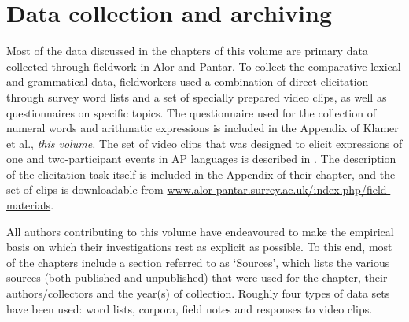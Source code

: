 {\section{Data collection and archiving}\label{sec:1:8}

Most of the data discussed in the chapters of this volume are primary data collected through fieldwork in Alor and Pantar. To collect the comparative lexical and grammatical data, fieldworkers used a combination of direct elicitation through survey word lists and a set of specially prepared video clips, as well as questionnaires on specific topics. The questionnaire used for the collection of numeral words and arithmatic expressions is included in the Appendix of Klamer et al., \textit{this volume.} The set of video clips that was designed to elicit expressions of one and two-participant events in AP languages is described in \citet{FeddenBrownTV}. The description of the elicitation task itself is included in the Appendix of their chapter, and the set of clips is downloadable from \url{www.alor-pantar.surrey.ac.uk/index.php/field-materials}.

All authors contributing to this volume have endeavoured to make the empirical basis on which their investigations rest as explicit as possible. To this end, most of the chapters include a section referred to as `Sources', which lists the various sources (both published and unpublished) that were used for the chapter, their authors/collectors and the year(s) of collection. Roughly four types of data sets have been used: word lists, corpora, field notes and responses to video clips. 

}
